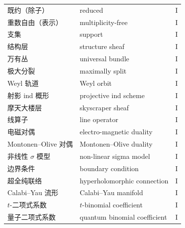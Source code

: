 \begin{longtable}{@{}p{5.4cm}p{6.3cm}p{2.2cm}@{}}
既约（除子） & reduced & I\\
重数自由（表示） & multiplicity-free & I\\
支集 & support & I\\
结构层 & structure sheaf & I\\
万有丛 & universal bundle & I\\
极大分裂 & maximally split & I\\
Weyl 轨道 & Weyl orbit & I\\
射影 ind 概形 & projective ind scheme & I\\
摩天大楼层 & skyscraper sheaf & I\\
线算子 & line operator & I\\
电磁对偶 & electro-magnetic duality & I\\
Montonen--Olive 对偶 & Montonen--Olive duality & I\\
非线性 $\sigma$ 模型 & non-linear sigma model & I\\
边界条件 & boundary condition & I\\
超全纯联络 & hyperholomorphic connection & I\\
Calabi--Yau 流形 & Calabi--Yau manifold & I\\
$t$-二项式系数 & $t$-binomial coefficient & I\\
量子二项式系数 & quantum binomial coefficient & I\\
\end{longtable}
